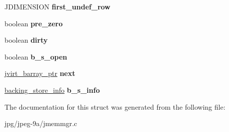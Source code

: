 \begin{DoxyCompactItemize}
\item 
\hypertarget{structjvirt__barray__control_aa4bba1a9fc9dfdbb43d926f27016bb08}{J\+D\+I\+M\+E\+N\+S\+I\+O\+N {\bfseries first\+\_\+undef\+\_\+row}}\label{structjvirt__barray__control_aa4bba1a9fc9dfdbb43d926f27016bb08}

\item 
\hypertarget{structjvirt__barray__control_a40d3b399333a4d0468c7fcb4465e4cdd}{boolean {\bfseries pre\+\_\+zero}}\label{structjvirt__barray__control_a40d3b399333a4d0468c7fcb4465e4cdd}

\item 
\hypertarget{structjvirt__barray__control_a324c033c65e470a10556ba02619c453c}{boolean {\bfseries dirty}}\label{structjvirt__barray__control_a324c033c65e470a10556ba02619c453c}

\item 
\hypertarget{structjvirt__barray__control_a5b588561840b293882bcf69e690962b2}{boolean {\bfseries b\+\_\+s\+\_\+open}}\label{structjvirt__barray__control_a5b588561840b293882bcf69e690962b2}

\item 
\hypertarget{structjvirt__barray__control_ae4b8dea777dcac10f1de982f0bedac0e}{\hyperlink{structjvirt__barray__control}{jvirt\+\_\+barray\+\_\+ptr} {\bfseries next}}\label{structjvirt__barray__control_ae4b8dea777dcac10f1de982f0bedac0e}

\item 
\hypertarget{structjvirt__barray__control_a6b33df0220c0545b4d7c7a8563a7fb18}{\hyperlink{structbacking__store__struct}{backing\+\_\+store\+\_\+info} {\bfseries b\+\_\+s\+\_\+info}}\label{structjvirt__barray__control_a6b33df0220c0545b4d7c7a8563a7fb18}

\end{DoxyCompactItemize}


The documentation for this struct was generated from the following file\+:\begin{DoxyCompactItemize}
\item 
jpg/jpeg-\/9a/jmemmgr.\+c\end{DoxyCompactItemize}
